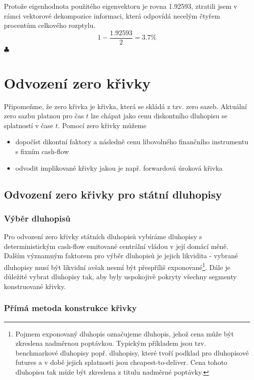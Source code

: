 \documentclass[a4paper]{book}
\begin{document}
Protože eigenhodnota použitého eigenvektoru je rovna 1.92593, ztratili jsem v rámci vektorové dekompozice informaci, která odpovídá necelým čtyřem procentům celkového rozptylu.
\begin{equation*}
1 - \frac{1.92593}{2} = 3.7\%
\end{equation*}
\noindent $\clubsuit$

\chapter{Odvození zero křivky}

Připomeňme, že zero křivka je křivka, která se skládá z tzv. zero sazeb. Aktuální zero sazbu platnou pro čas $t$ lze chápat jako cenu diskontního dluhopisu se splatností v čase $t$. Pomocí zero křivky můžeme
\begin{itemize}
\item dopočíst dikontní faktory a následně cenu libovolného finančního instrumentu s fixním cash-flow
\item odvodit implikované křivky jakou je např. forwardová úroková křivka
\end{itemize}

\section{Odvození zero křivky pro státní dluhopisy}

\subsection{Výběr dluhopisů}

Pro odvození zero křivky státních dluhopisů vybíráme dluhopisy s deterministickým cash-flow emitované centrální vládou v její domácí měně. Dalším významným faktorem pro výběr dluhopisů je jejich likvidita - vybrané dluhopisy musí být likvidní avšak nesmí být přespříliš exponované\footnote{Pojmem exponovaný dluhopis označujeme dluhopis, jehož cena může být zkreslena nadměrnou poptávkou. Typickým příkladem jsou tzv. benchmarkové dluhopisy popř. dluhopisy, které tvoří podklad pro dluhopisové futures a v době jejich splatnosti jsou cheapest-to-deliver. Cena tohoto dluhopisu tak může být zkreslena z titulu nadměrné poptávky.}. Dále je důležité vybrat dluhopisy tak, aby byly uspokojivě pokryty všechny segmenty konstruované křivky.

\subsection{Přímá metoda konstrukce křivky}
\end{document}
